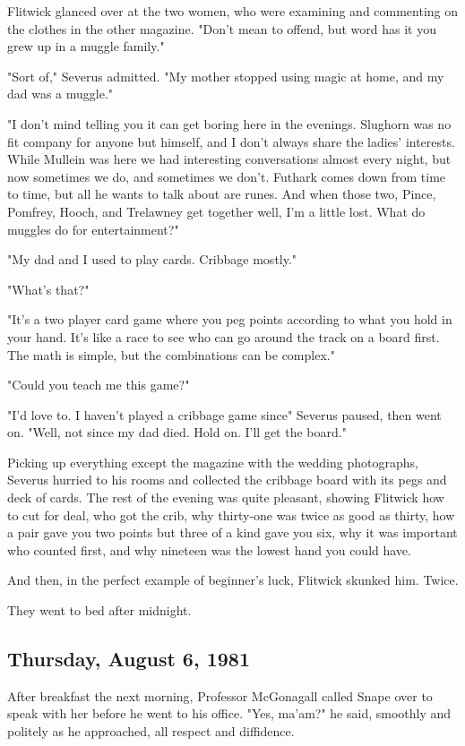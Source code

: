 Flitwick glanced over at the two women, who were examining and commenting on the clothes in the other magazine. "Don't mean to offend, but word has it you grew up in a muggle family."

"Sort of," Severus admitted. "My mother stopped using magic at home, and my dad was a muggle."

"I don't mind telling you it can get boring here in the evenings. Slughorn was no fit company for anyone but himself, and I don't always share the ladies' interests. While Mullein was here we had interesting conversations almost every night, but now sometimes we do, and sometimes we don't. Futhark comes down from time to time, but all he wants to talk about are runes. And when those two, Pince, Pomfrey, Hooch, and Trelawney get together{\el} well, I'm a little lost. What do muggles do for entertainment?"

"My dad and I used to play cards. Cribbage mostly."

"What's that?"

"It's a two player card game where you peg points according to what you hold in your hand. It's like a race to see who can go around the track on a board first. The math is simple, but the combinations can be complex."

"Could you teach me this game?"

"I'd love to. I haven't played a cribbage game since{\el}" Severus paused, then went on. "Well, not since my dad died. Hold on. I'll get the board."

Picking up everything except the magazine with the wedding photographs, Severus hurried to his rooms and collected the cribbage board with its pegs and deck of cards. The rest of the evening was quite pleasant, showing Flitwick how to cut for deal, who got the crib, why thirty-one was twice as good as thirty, how a pair gave you two points but three of a kind gave you six, why it was important who counted first, and why nineteen was the lowest hand you could have.

And then, in the perfect example of beginner's luck, Flitwick skunked him. Twice.

They went to bed after midnight.

\subsection{Thursday, August 6, 1981}

After breakfast the next morning, Professor McGonagall called Snape over to speak with her before he went to his office. "Yes, ma'am?" he said, smoothly and politely as he approached, all respect and diffidence.

